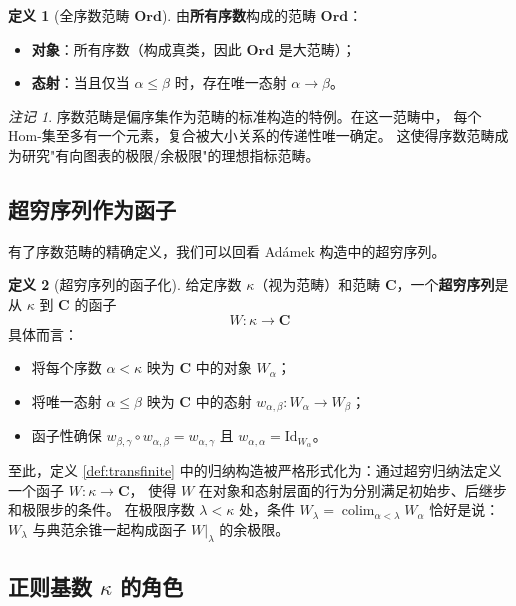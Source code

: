 \documentclass[UTF8,a4paper,12pt]{ctexart}
\theoremstyle{definition}
\newtheorem{definition}{定义}[section]
\theoremstyle{plain}
\theoremstyle{remark}
\newtheorem{remark}{注记}[section]
\newcommand{\cat}[1]{\mathbf{#1}}
\newcommand{\Id}{\mathrm{Id}}
\newcommand{\Hom}{\mathrm{Hom}}
\newcommand{\colim}{\operatorname{colim}}
\newcommand{\Ord}{\mathbf{Ord}}
\begin{document}
\begin{definition}[全序数范畴 $\Ord$]
由\textbf{所有序数}构成的范畴 $\Ord$：
\begin{itemize}
    \item \textbf{对象}：所有序数（构成真类，因此 $\Ord$ 是大范畴）；
    \item \textbf{态射}：当且仅当 $\alpha \le \beta$ 时，存在唯一态射 $\alpha \to \beta$。
\end{itemize}
\end{definition}

\begin{remark}
序数范畴是偏序集作为范畴的标准构造的特例。在这一范畴中，
每个 $\Hom$-集至多有一个元素，复合被大小关系的传递性唯一确定。
这使得序数范畴成为研究"有向图表的极限/余极限"的理想指标范畴。
\end{remark}

\subsection{超穷序列作为函子}

有了序数范畴的精确定义，我们可以回看 Adámek 构造中的超穷序列。

\begin{definition}[超穷序列的函子化]
给定序数 $\kappa$（视为范畴）和范畴 $\cat{C}$，一个\textbf{超穷序列}是从 $\kappa$ 到 $\cat{C}$ 的函子
\[
W: \kappa \to \cat{C}
\]
具体而言：
\begin{itemize}
    \item 将每个序数 $\alpha < \kappa$ 映为 $\cat{C}$ 中的对象 $W_\alpha$；
    \item 将唯一态射 $\alpha \le \beta$ 映为 $\cat{C}$ 中的态射 $w_{\alpha, \beta}: W_\alpha \to W_\beta$；
    \item 函子性确保 $w_{\beta, \gamma} \circ w_{\alpha, \beta} = w_{\alpha, \gamma}$ 且 $w_{\alpha, \alpha} = \Id_{W_\alpha}$。
\end{itemize}
\end{definition}

至此，定义 \ref{def:transfinite} 中的归纳构造被严格形式化为：通过超穷归纳法定义一个函子 $W: \kappa \to \cat{C}$，
使得 $W$ 在对象和态射层面的行为分别满足初始步、后继步和极限步的条件。
在极限序数 $\lambda < \kappa$ 处，条件 $W_\lambda = \colim_{\alpha < \lambda} W_\alpha$ 恰好是说：
$W_\lambda$ 与典范余锥一起构成函子 $W|_\lambda$ 的余极限。

\subsection{正则基数 $\kappa$ 的角色}
\end{document}
